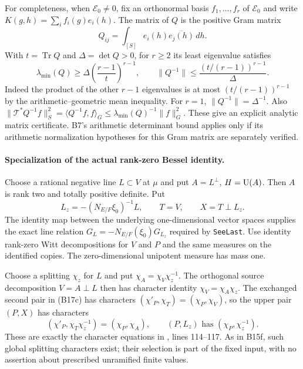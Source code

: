 \documentclass[11pt]{article}
\theoremstyle{definition}\newtheorem{definition}[theorem]{Definition}\newtheorem{remark}[theorem]{Remark}
\begin{document}
For completeness, when $\mathcal E_0\ne0$, fix an orthonormal basis $f_1,\ldots,f_r$ of
$\mathcal E_0$ and write $K(g,h)=\sum_i f_i(g)e_i(h)$. The matrix
of $Q$ is the positive Gram matrix
\[
 Q_{ij}=\int_{[S]}e_i(h)\overline{e_j(h)}\,dh .
\]
With $t=\operatorname{Tr}Q$ and $\Delta=\det Q>0$, for $r\geq2$
its least eigenvalue satisfies
\[
 \lambda_{\min}(Q)\geq
       \Delta\left(\frac{r-1}{t}\right)^{r-1},
 \qquad
 \|Q^{-1}\|\leq
       \frac{(t/(r-1))^{r-1}}{\Delta}.
 \tag{B17f}
\]
Indeed the product of the other $r-1$ eigenvalues is at most
$(t/(r-1))^{r-1}$ by the arithmetic--geometric mean inequality.
For $r=1$, $\|Q^{-1}\|=\Delta^{-1}$.
Also
$\|\mathcal T^*Q^{-1}f\|_S^2
 =\langle Q^{-1}f,f\rangle_G
 \leq\lambda_{\min}(Q)^{-1}\|f\|_G^2$.
These give an explicit analytic matrix certificate. B7's
arithmetic determinant bound applies only if its arithmetic
normalization hypotheses for this Gram matrix are separately
verified.

\paragraph{Specialization of the actual rank-zero Bessel identity.}
Choose a rational negative line $L\subset V$ at $\mu$ and put
$A=L^\perp$, $H=\operatorname{U}(A)$. Then $A$ is rank two and totally
positive definite. Put
\[
 L_z=-(N_{E/F}\xi_0)^{-1}L,\qquad
 T=V,\qquad X=T\perp L_z .
\]
The identity map between the underlying one-dimensional vector
spaces supplies the exact line relation
$G_L=-N_{E/F}(\xi_0)G_{L_z}$ required by
\texttt{SeeLast}. Use identity rank-zero Witt decompositions
for $V$ and $P$ and the same measures on the identified copies.
The zero-dimensional unipotent measure has mass one.

Choose a splitting $\chi_z$ for $L$ and put
$\chi_A=\chi_V\chi_z^{-1}$. The orthogonal source decomposition
$V=A\perp L$ then has character identity
$\chi_V=\chi_A\chi_z$. The exchanged second pair in (B17c)
has characters $(\chi'_P,\chi_T)=(\chi_P,\chi_V)$, so the
upper pair $(P,X)$ has characters
\[
 (\chi'_P,\chi_T\chi_z^{-1})=(\chi_P,\chi_A),
 \qquad (P,L_z)\text{ has }(\chi_P,\chi_z^{-1}).
\]
These are exactly the character equations in
,
lines 114--117. As in B15f,
such global splitting characters exist; their selection is
part of the fixed input, with no assertion about prescribed
unramified finite values.
\end{document}
